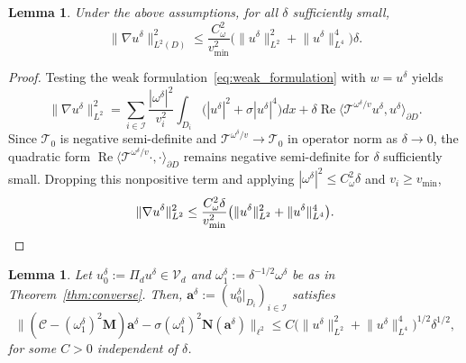 \documentclass[a4paper,reqno,twoside]{amsart}
\numberwithin{equation}{section}
\newtheorem{lemma}[theorem]{Lemma}
\theoremstyle{definition}
\newcommand{\<}{\ensuremath \leq}
\renewcommand{\>}{\ensuremath \geq}
\begin{document}
\begin{lemma}\label{lem:gradientbound}
    Under the above assumptions, for all $\delta$ sufficiently small,
    \begin{equation}
        \lVert \nabla u^\delta \rVert_{L^2(D)}^2
        \leq \frac{C_\omega^2}{v_{\min}^2}
        \bigl( \lVert u^\delta \rVert_{L^2}^2
          + \lVert u^\delta \rVert_{L^4}^4 \bigr) \delta.
    \end{equation}
\end{lemma}

\begin{proof}
    Testing the weak formulation~\eqref{eq:weak_formulation} with
    $w = u^\delta$ yields
    \begin{equation}
        \lVert \nabla u^\delta \rVert_{L^2}^2
        = \sum_{i \in \mathcal{I}} \frac{|\omega^\delta|^2}{v_i^2}
          \int_{D_i}
          \bigl( |u^\delta|^2 + \sigma |u^\delta|^4 \bigr) dx
        + \delta \operatorname{Re}
          \langle \mathcal{T}^{\omega^\delta/v} u^\delta,
          u^\delta \rangle_{\partial D}.
    \end{equation}
    Since $\mathcal{T}_0$ is negative semi-definite and
    $\mathcal{T}^{\omega^\delta/v} \to \mathcal{T}_0$ in operator norm
    as $\delta \to 0$, the quadratic form
    $\operatorname{Re}\langle \mathcal{T}^{\omega^\delta/v} \cdot,
    \cdot \rangle_{\partial D}$ remains negative semi-definite for $\delta$ sufficiently small.
    Dropping this nonpositive term and applying
    $|\omega^\delta|^2 \leq C_\omega^2 \delta$ and
    $v_i \geq v_{\min}$,
    \begin{equation}
        \lVert \nabla u^\delta \rVert_{L^2}^2
        \leq \frac{C_\omega^2 \delta}{v_{\min}^2}
        \bigl( \lVert u^\delta \rVert_{L^2}^2
          + \lVert u^\delta \rVert_{L^4}^4 \bigr). \qedhere
    \end{equation}
\end{proof}


\begin{lemma}\label{lem:approximate_discrete}
    Let $u_0^\delta := \Pi_d u^\delta \in \mathcal{V}_d$ and
    $\omega_1^\delta := \delta^{-1/2}\omega^\delta$ be as in
    Theorem~\ref{thm:converse}. Then,
    $\mathbf{a}^\delta := (u_0^\delta|_{D_i})_{i \in \mathcal{I}}$
    satisfies
    \begin{equation}
        \bigl\lVert
          (\mathcal{C} - (\omega_1^\delta)^2 \mathbf{M}) \mathbf{a}^\delta
          - \sigma (\omega_1^\delta)^2 \mathbf{N}(\mathbf{a}^\delta)
        \bigr\rVert_{\ell^2}
        \leq C
        \bigl( \lVert u^\delta \rVert_{L^2}^2
          + \lVert u^\delta \rVert_{L^4}^4 \bigr)^{1/2}
        \delta^{1/2},
    \end{equation}
    for some $C > 0$ independent of $\delta$.
\end{lemma}
\end{document}
